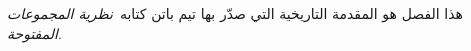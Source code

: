 \documentclass[../../../include/open-logic-chapter]{subfiles}
\begin{document}
	

\begin{editorial}
هذا الفصل هو المقدمة التاريخية التي صدّر بها تيم باتن كتابه~\emph{نظرية
المجموعات المفتوحة}.
\end{editorial}

\end{document}
